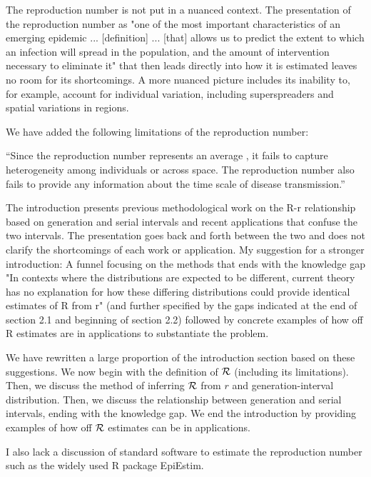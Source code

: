 \documentclass[12pt]{article}
\newcommand{\RR}{\ensuremath{{\cal R}}}
\newcommand{\revtext}{\textsf}
\begin{document}
\revtext{The reproduction number is not put in a nuanced context. The presentation of the reproduction number as "one of the most important characteristics of an emerging epidemic ... [definition] ... [that] allows us to predict the extent to which an infection will spread in the population, and the amount of intervention necessary to eliminate it" that then leads directly into how it is estimated leaves no room for its shortcomings. A more nuanced picture includes its inability to, for example, account for individual variation, including superspreaders and spatial variations in regions.}

We have added the following limitations of the reproduction number:

``Since the reproduction number represents an average \citep{diekmann1990definition, anderson1991infectious}, it fails to capture heterogeneity among individuals or across space.
The reproduction number also fails to provide any information about the time scale of disease transmission.''

\revtext{The introduction presents previous methodological work on the R-r relationship based on generation and serial intervals and recent applications that confuse the two intervals. The presentation goes back and forth between the two and does not clarify the shortcomings of each work or application. My suggestion for a stronger introduction: A funnel focusing on the methods that ends with the knowledge gap "In contexts where the distributions are expected to be different, current theory has no explanation for how these differing distributions could provide identical estimates of R from r" (and further specified by the gaps indicated at the end of section 2.1 and beginning of section 2.2) followed by concrete examples of how off R estimates are in applications to substantiate the problem.}

We have rewritten a large proportion of the introduction section based on these suggestions.
We now begin with the definition of $\RR$ (including its limitations). 
Then, we discuss the method of inferring $\RR$ from $r$ and generation-interval distribution. 
Then, we discuss the relationship between generation and serial intervals, ending with the knowledge gap.
We end the introduction by providing examples of how off $\RR$ estimates can be in applications.

\revtext{I also lack a discussion of standard software to estimate the reproduction number such as the widely used R package EpiEstim.}
\end{document}
